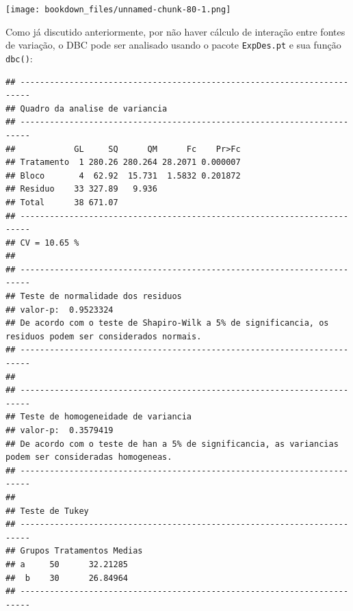 \documentclass[
]{article}
\newenvironment{Shaded}{\begin{snugshade}}{\end{snugshade}}
\newcommand{\DataTypeTok}[1]{\textcolor[rgb]{0.13,0.29,0.53}{#1}}
\newcommand{\DecValTok}[1]{\textcolor[rgb]{0.00,0.00,0.81}{#1}}
\newcommand{\KeywordTok}[1]{\textcolor[rgb]{0.13,0.29,0.53}{\textbf{#1}}}
\newcommand{\NormalTok}[1]{#1}
\newcommand{\OperatorTok}[1]{\textcolor[rgb]{0.81,0.36,0.00}{\textbf{#1}}}
\newcommand{\StringTok}[1]{\textcolor[rgb]{0.31,0.60,0.02}{#1}}
\begin{document}
\begin{Shaded}
\end{Shaded}

\texttt{[image: bookdown\_files/unnamed-chunk-80-1.png]}

Como já discutido anteriormente, por não haver cálculo de interação entre fontes de variação, o DBC pode ser analisado usando o pacote \texttt{ExpDes.pt} e sua função \texttt{dbc()}:

\begin{Shaded}
\end{Shaded}

\begin{verbatim}
## ------------------------------------------------------------------------
## Quadro da analise de variancia
## ------------------------------------------------------------------------
##            GL     SQ      QM      Fc    Pr>Fc
## Tratamento  1 280.26 280.264 28.2071 0.000007
## Bloco       4  62.92  15.731  1.5832 0.201872
## Residuo    33 327.89   9.936                 
## Total      38 671.07                         
## ------------------------------------------------------------------------
## CV = 10.65 %
## 
## ------------------------------------------------------------------------
## Teste de normalidade dos residuos 
## valor-p:  0.9523324 
## De acordo com o teste de Shapiro-Wilk a 5% de significancia, os residuos podem ser considerados normais.
## ------------------------------------------------------------------------
## 
## ------------------------------------------------------------------------
## Teste de homogeneidade de variancia 
## valor-p:  0.3579419 
## De acordo com o teste de han a 5% de significancia, as variancias podem ser consideradas homogeneas.
## ------------------------------------------------------------------------
## 
## Teste de Tukey
## ------------------------------------------------------------------------
## Grupos Tratamentos Medias
## a     50      32.21285 
##  b    30      26.84964 
## ------------------------------------------------------------------------
\end{verbatim}
\end{document}
